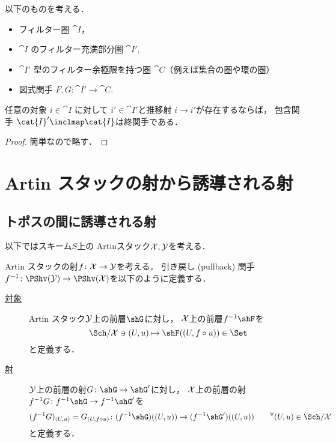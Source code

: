     \begin{Lemma}\label{lemma:filtered_colimit_over_sub_index_category}
        以下のものを考える．
        \begin{itemize}
            \item フィルター圏 $\cat{I}$，
            \item $\cat{I}$ のフィルター充満部分圏 $\cat{I}'$,
            \item $\cat{I}'$ 型のフィルター余極限を持つ圏 $\cat{C}$（例えば集合の圏や環の圏）
            \item 図式関手 $F,G \colon \cat{I}' \to \cat{C}$.
        \end{itemize}

        任意の対象 $i \in \cat{I}$ に対して
        $i' \in \cat{I}'$と推移射 $i \to i'$が存在するならば，
        包含関手 $\cat{I}' \inclmap \cat{I}$は終関手である．
    \end{Lemma}
    \begin{proof}
        簡単なので略す．
    \end{proof}

    \section{Artin スタックの射から誘導される射}\label{sec:induced_mor_from_art_st_mor}

\subsection{トポスの間に誘導される射}
    以下ではスキーム$S$上の Artinスタック$\mathcal{X}, \mathcal{Y}$を考える．
    
    \begin{Def}
        Artin スタックの射$f \colon \mathcal{X} \to \mathcal{Y}$を考える．
        引き戻し (pullback) 関手$f^{-1} \colon \PShv(\stY) \to \PShv(\stX)$を以下のように定義する．
        \begin{description}
        \item[\underline{対象}] 
            Artin スタック$\mathcal{Y}$上の前層$\shG$に対し，
            $\mathcal{X}$上の前層$f^{-1}\shF$を
            \[ \Sch/\stX \ni (U,u) \mapsto \shF((U, f \circ u)) \in \Set \]
            と定義する．

        \item[\underline{射}]
            $\mathcal{Y}$上の前層の射$G \colon \shG \to \shG'$に対し，
            $\mathcal{X}$上の前層の射$f^{-1}G \colon f^{-1}\shG \to f^{-1}\shG'$を
            \[
                (f^{-1}G)_{(U,u)}=G_{(U, f \circ u)} \colon (f^{-1}\shG)((U,u)) \to (f^{-1}\shG')((U,u))
                \qquad {}^{\forall} (U,u) \in \Sch/\stX
            \]
            と定義する．
        \end{description}
    \end{Def}


